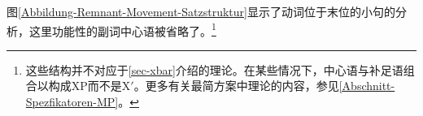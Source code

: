 图\vref{Abbildung-Remnant-Movement-Satzstruktur}显示了动词位于末位的小句的分析，这里功能性的副词中心语被省略了。\footnote{%
这些结构并不对应于\ref{sec-xbar}介绍的\xbarc 理论。在某些情况下，中心语与补足语组合以构成XP而不是X$'$。更多有关最简方案中\xbarc 理论的内容，参见\ref{Abschnitt-Spezfikatoren-MP}。
}
